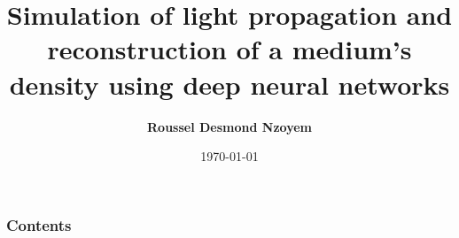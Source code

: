 \documentclass[notes]{beamer}
\begin{document}

\title[Deep learning for inverse problems in radiative transfer]{Simulation of light propagation and reconstruction of a medium's density using deep neural networks}



\author[Roussel Desmond Nzoyem]{\large \bfseries Roussel Desmond Nzoyem}


\date[Soutenance mi-stage 2021]{\today}


\maketitle




\begin{frame}
  \small
  \frametitle{Contents}
  \tableofcontents
\end{frame}




% 

% 

% 

% 




\appendix   %
\end{document}
